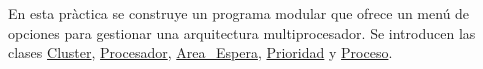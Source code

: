En esta pràctica se construye un programa modular que ofrece un menú de opciones para gestionar una arquitectura multiprocesador. Se introducen las clases \mbox{\hyperlink{classCluster}{Cluster}}, \mbox{\hyperlink{classProcesador}{Procesador}}, \mbox{\hyperlink{classArea__Espera}{Area\+\_\+\+Espera}}, \mbox{\hyperlink{classPrioridad}{Prioridad}} y \mbox{\hyperlink{classProceso}{Proceso}}. 